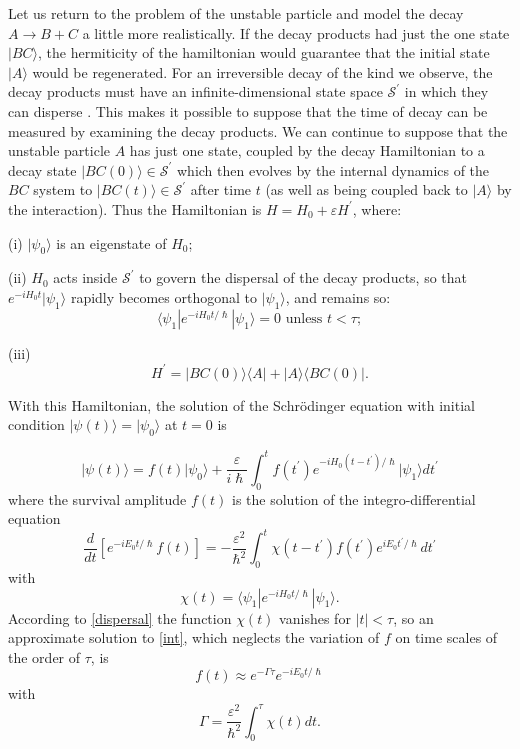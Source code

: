 \documentclass[12pt,a4paper,reqno]{article}
\newcommand{\upline}{\vspace{-\abovedisplayskip}\vspace{-\baselineskip}}
\renewcommand{\(}{\left(}
\renewcommand{\)}{\right)}
\renewcommand{\hbar}{\hslash}
\renewcommand{\S}{\mathcal{S}}
\newcommand{\<}{\langle}
\renewcommand{\>}{\rangle}
\theoremstyle{plain} %
\theoremstyle{definition}
\theoremstyle{remark}
\begin{document}
 Let us return to the problem of the unstable particle and model the
decay  $A\rightarrow B+C$ a little more realistically. If the decay
products  had just the one state $|BC\>$, the hermiticity of the
hamiltonian  would guarantee that the initial state $|A\>$ would be
regenerated.  For an irreversible decay of the kind we observe, the
decay products  must have an infinite-dimensional state space
$\S^\prime$ in which they can disperse \cite{rapid-dispersal}. This
makes it possible to suppose that the time of decay can be measured by
examining the decay products.  We can continue to suppose that the
unstable particle $A$ has just one  state, coupled by the decay
Hamiltonian to a decay state $|BC(0)\>\in \S^\prime$  which then evolves
by the internal dynamics of the $BC$ system to $|BC(t)\>\in \S^\prime$
after time $t$ (as well as being coupled back to $|A\>$ by the 
interaction). Thus the Hamiltonian is $H = H_0 + \varepsilon H^\prime$,
where:

\vspace{0.5\baselineskip}
\noindent (i) $|\psi_0\>$ is an eigenstate of $H_0$;
\vspace{0.5\baselineskip}

\noindent (ii) $H_0$ acts inside $\S^\prime$ to govern the dispersal of
the decay products, so that $e^{-iH_0t}|\psi_1\>$ rapidly becomes
orthogonal to $|\psi_1\>$, and remains so:
\begin{equation}\label{dispersal} 
\<\psi_1|e^{-iH_0t/\hbar}|\psi_1\> = 0 \text{  unless  } t < \tau;
\end{equation}

\noindent (iii)
\upline
\[ 
H^\prime = |BC(0)\>\<A| + |A\>\<BC(0)|.
\]

With this Hamiltonian, the solution of the Schr\"odinger equation with
initial condition $|\psi(t)\> = |\psi_0\>$ at $t=0$ is \cite{obsdecay}

\begin{equation}\label{decay2}
|\psi(t)\> = f(t)|\psi_0\> + \frac{\varepsilon}{i\hbar}\int_0^t
f(t^\prime)e^{-iH_0(t-t^\prime)/\hbar}|\psi_1\>dt^\prime
\end{equation}
where the survival amplitude $f(t)$ is the solution of the
integro-differential equation
\begin{equation}\label{int}
\frac{d}{dt}\left[e^{-iE_0t/\hbar}f(t)\right] =
-\frac{\varepsilon^2}{\hbar^2}
\int_0^t\chi(t-t^\prime)f(t^\prime)e^{iE_0t^\prime/\hbar}dt^\prime 
\end{equation}
with
\[
\chi(t) = \<\psi_1|e^{-iH_0t/\hbar}|\psi_1\>.
\]
According to \eqref{dispersal} the function $\chi(t)$ vanishes for
$|t|<\tau$, so an approximate solution to \eqref{int}, which neglects
the variation of $f$ on time scales of the order of $\tau$, is
\[
f(t) \approx e^{-\Gamma\tau}e^{-iE_0t/\hbar}
\]
with 
\[
\Gamma = \frac{\varepsilon^2}{\hbar^2}\int_0^\tau\chi(t)dt.
\]
\end{document}
